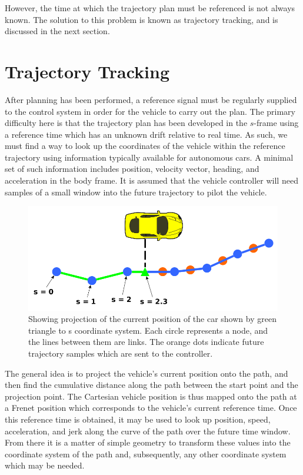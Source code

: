 \documentclass[letterpaper, 10 pt, conference]{ieeeconf}  %
\begin{document}
However, the time at which the trajectory plan must be referenced is not always known.
The solution to this problem is known as trajectory tracking, and is discussed in the next section.



\section{Trajectory Tracking} \label{sec:trajectorytracking}

After planning has been performed, a reference signal must be regularly supplied to the control system in order for the vehicle to carry out the plan.
The primary difficulty here is that the trajectory plan has been developed in the $s$-frame using a reference time which has an unknown drift relative to real time.
As such, we must find a way to look up the coordinates of the vehicle within the reference trajectory using information typically available for autonomous cars.
A minimal set of such information includes position, velocity vector, heading, and acceleration in the body frame.
It is assumed that the vehicle controller will need samples of a small window into the future trajectory to pilot the vehicle.

\begin{figure}[thpb]
  \centering
  \includegraphics[width=0.65\columnwidth]{graphics/PathProjectionSlice.png}
  \caption{Showing projection of the current position of the car shown by green triangle to s coordinate system. Each circle represents a node, and the lines between them are links. The orange dots indicate future trajectory samples which are sent to the controller.
  }

  \label{fig:cartos}
\end{figure}

The general idea is to project the vehicle's current position onto the path, and then find the cumulative distance along the path between the start point and the projection point.
The Cartesian vehicle position is thus mapped onto the path at a Frenet position which corresponds to the vehicle's current reference time.
Once this reference time is obtained, it may be used to look up position, speed, acceleration, and jerk along the curve of the path over the future time window.
From there it is a matter of simple geometry to transform these values into the coordinate system of the path and, subsequently, any other coordinate system which may be needed.
\end{document}
